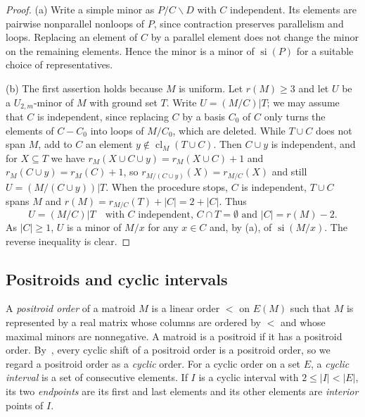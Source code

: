 \documentclass[11pt]{amsart}
\theoremstyle{definition}
\theoremstyle{remark}
\numberwithin{equation}{section}
\newcommand{\cl}{\operatorname{cl}}
\newcommand{\si}{\operatorname{si}}
\begin{document}
\begin{proof}
(a) Write a simple minor as $P/C\backslash D$ with $C$ independent. Its elements are pairwise nonparallel nonloops of $P$, since contraction preserves parallelism and loops. Replacing an element of $C$ by a parallel element does not change the minor on the remaining elements. Hence the minor is a minor of $\si(P)$ for a suitable choice of representatives.

(b) The first assertion holds because $M$ is uniform. Let $r(M)\ge3$ and let $U$ be a $U_{2,m}$-minor of $M$ with ground set $T$. Write $U=(M/C)|T$; we may assume that $C$ is independent, since replacing $C$ by a basis $C_0$ of $C$ only turns the elements of $C-C_0$ into loops of $M/C_0$, which are deleted. While $T\cup C$ does not span $M$, add to $C$ an element $y\notin\cl_M(T\cup C)$. Then $C\cup y$ is independent, and for $X\subseteq T$ we have $r_M(X\cup C\cup y)=r_M(X\cup C)+1$ and $r_M(C\cup y)=r_M(C)+1$, so $r_{M/(C\cup y)}(X)=r_{M/C}(X)$ and still $U=(M/(C\cup y))|T$. When the procedure stops, $C$ is independent, $T\cup C$ spans $M$ and $r(M)=r_{M/C}(T)+|C|=2+|C|$. Thus
\begin{equation}\label{eq:standardC}
U=(M/C)|T\quad\text{with $C$ independent, $C\cap T=\emptyset$ and $|C|=r(M)-2$.}
\end{equation}
As $|C|\ge1$, $U$ is a minor of $M/x$ for any $x\in C$ and, by (a), of $\si(M/x)$. The reverse inequality is clear.
\end{proof}

\subsection{Positroids and cyclic intervals}\label{sec:positroids}
A \emph{positroid order} of a matroid $M$ is a linear order $<$ on $E(M)$ such that $M$ is represented by a real matrix whose columns are ordered by $<$ and whose maximal minors are nonnegative. A matroid is a positroid if it has a positroid order. By~\cite[Lemma~3.3]{ARW16}, every cyclic shift of a positroid order is a positroid order, so we regard a positroid order as a \emph{cyclic} order. For a cyclic order on a set $E$, a \emph{cyclic interval} is a set of consecutive elements. If $I$ is a cyclic interval with $2\le|I|<|E|$, its two \emph{endpoints} are its first and last elements and its other elements are \emph{interior} points of $I$.
\end{document}
